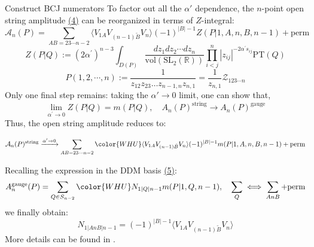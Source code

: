 \documentclass{beamer}
\begin{document}
\begin{frame}[allowframebreaks]{Construct BCJ numerators}
	To factor out all the $\alpha'$ dependence, the $n$-point open string amplitude \hyperlink{eq:n-pt}{\color{blue}(4)} can be reorganized in terms of $Z$-integral:
	\begin{equation*}
		\mathcal{A}_n(P)=\sum_{AB=23\cdots n-2}\langle V_{1A}V_{(n-1)\tilde{B}}V_n\rangle(-1)^{|B|-1}Z(P|1,A,n,B,n-1)+\mathrm{perm}
	\end{equation*} 
	\begin{equation*}
		Z(P|Q):=(2\alpha^{\prime})^{n-3}\int_{D(P)}\frac{dz_1dz_2\cdots dz_n}{\mathrm{vol}(\mathrm{SL}_2(\mathbb{R}))}\prod_{i<j}^n\left|z_{ij}\right|^{-2\alpha^{\prime}s_{ij}}\mathrm{PT}(Q)
	\end{equation*}
	\begin{equation*}
		P(1,2,\cdots, n):=\frac{1}{z_{12}z_{23}\ldots z_{n-1,n}z_{n,1}}=\frac{1}{z_{n,1}}\mathcal{Z}_{123\cdots n}
	\end{equation*}
	Only one final step remains: taking the $\alpha' \to 0$ limit, one can show that,
	\begin{equation*}
		\lim_{\alpha^{\prime}\to0}Z(P|Q)=m(P|Q),\quad A_n(P)^\mathrm{string}\to A_n(P)^\mathrm{gauge}
	\end{equation*}
	Thus, the open string amplitude reduces to:
	\begin{small}
	\begin{equation*}
		\mathcal{A}_{n}(P)^{\mathrm{string}}\xrightarrow{\alpha^{\prime}\to0}\sum_{AB=23\cdots n-2}{\color{WHU}\langle V_{1A}V_{(n-1)\tilde{B}}V_{n}\rangle(-1)^{|B|-1}}m(P|1,A,n,B,n-1)+\mathrm{perm}
	\end{equation*}
	\end{small}
	Recalling the expression in the DDM basis \hyperlink{eq:ddm}{\color{blue}(5)}:
	\begin{equation*}
		A_n^{\text{gauge}}(P) = \sum_{Q\in S_{n-2}}{\color{WHU}N_{1|Q|n-1}}m(P|1,Q,n-1),\quad \sum_Q\iff\sum_{AnB}+\mathrm{perm}
	\end{equation*}
	we finally obtain:
	\begin{equation*}
		\boxed{N_{1|AnB|n-1}=(-1)^{|B|-1}\langle V_{1A}V_{(n-1)\tilde{B}}V_{n}\rangle}
	\end{equation*}
	More details can be found in \cite{Mafra:2011kj}.
\end{frame}
\end{document}
